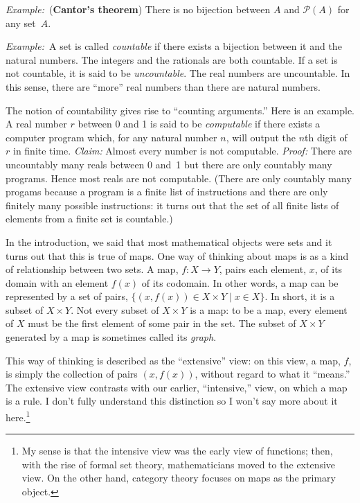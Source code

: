 \documentclass[12pt, a4paper]{article}
\newcommand{\defn}[1]{\textbf{#1}}
\newcommand{\eg}{\emph{Example:}\relax}
\begin{document}
\eg\ (\defn{Cantor's theorem}) There is no bijection between $A$ and
$\mathcal{P}(A)$ for any set~$A$.

\eg\ A set is called \emph{countable} if there exists a bijection
between it and the natural numbers. The integers and the rationals are
both countable. If a set is not countable, it is said to be
\emph{uncountable}. The real numbers are uncountable. In this sense,
there are ``more'' real numbers than there are natural numbers.

The notion of countability gives rise to “counting arguments.” Here is
an example. A real number $r$ between 0 and 1 is said to be
\emph{computable} if there exists a computer program which, for any
natural number $n$, will output the $n$th digit of $r$ in finite
time. \emph{Claim:} Almost every number is not
computable. \emph{Proof:} There are uncountably many reals between 0
and~1 but there are only countably many programs. Hence most reals are
not computable. (There are only countably many progams because a
program is a finite list of instructions and there are only finitely
many possible instructions: it turns out that the set of all finite
lists of elements from a finite set is countable.)

In the introduction, we said that most mathematical objects were sets
and it turns out that this is true of maps. One way of thinking about
maps is as a kind of relationship between two sets. A map, $f:X\to Y$,
pairs each element, $x$, of its domain with an element $f(x)$ of its
codomain. In other words, a map can be represented by a set of pairs,
$\{(x,f(x)) \in X\times Y\mid x\in X\}$. In short, it is a subset of $X\times Y$. Not
every subset of $X\times Y$ is a map: to be a map, every element of $X$
must be the first element of some pair in the set. The subset of $X\times
Y$ generated by a map is sometimes called its \emph{graph}.

This way of thinking is described as the “extensive” view: on this
view, a map, $f$, is simply the collection of pairs $(x, f(x))$,
without regard to what it “means.” The extensive view contrasts with
our earlier, “intensive,” view, on which a map is a rule. I don't
fully understand this distinction so I won't say more about it
here.\footnote{My sense is that the intensive view was the early view
of functions; then, with the rise of formal set theory, mathematicians
moved to the extensive view. On the other hand, category theory
focuses on maps as the primary object.}
\end{document}
